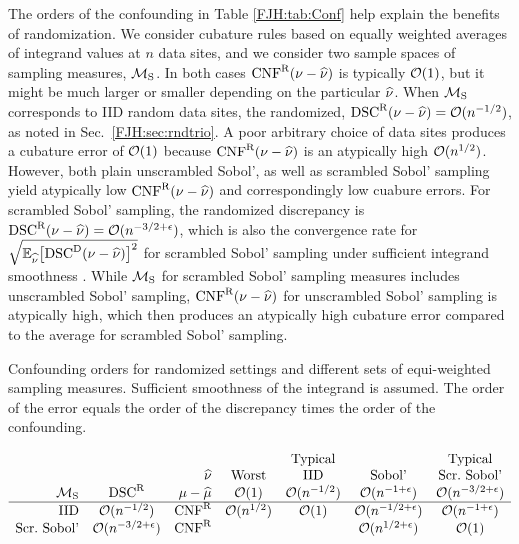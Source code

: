 \documentclass[graybox,footinfo]{svmult}
\begin{document}
The orders of the confounding in Table \ref{FJH:tab:Conf} help explain the 
benefits of randomization.  We consider cubature rules based on equally weighted 
averages of integrand values at $n$ data sites, and we consider two sample spaces of 
sampling measures, ${\mathcal{M}}_{\textup{S}}$.  In both cases $\textup{CNF}^{\textup{R}}(\nu - \widehat{\nu})$ is 
typically ${\mathcal{O}}(1)$, but it might be much larger or smaller depending on the particular 
$\widehat{\nu}$.  When ${\mathcal{M}}_{\textup{S}}$ corresponds to IID random data sites, the 
randomized, $\textup{DSC}^{\textup{R}}(\nu - \widehat{\nu}) = {\mathcal{O}}(n^{-1/2})$, as noted in Sec.\ 
\ref{FJH:sec:rndtrio}.  A poor 
arbitrary choice of data sites produces a cubature error of ${\mathcal{O}}(1)$ because 
$\textup{CNF}^{\textup{R}}(\nu - \widehat{\nu})$ is an atypically high ${\mathcal{O}}(n^{1/2})$.  
However, both plain unscrambled Sobol', as well as scrambled Sobol' sampling yield 
atypically low $\textup{CNF}^{\textup{R}}(\nu - \widehat{\nu})$ and correspondingly low cuabure errors.  For 
scrambled Sobol' sampling, the randomized discrepancy is $\textup{DSC}^{\textup{R}}(\nu - \widehat{\nu}) 
={\mathcal{O}}(n^{-3/2 + 
\epsilon})$, which is also the convergence rate for $\sqrt{{\mathbb{E}}_{\widehat{\nu}}\bigl[\textup{DSC}^{\textup{D}}(\nu - 
\widehat{\nu})\bigr ]^2}$ for scrambled 
Sobol' sampling under sufficient integrand smoothness \cite{HicHon98a, HicYue00}.
While ${\mathcal{M}}_{\textup{S}}$ for scrambled Sobol' sampling measures includes 
unscrambled 
Sobol' 
sampling, $\textup{CNF}^{\textup{R}}(\nu - \widehat{\nu})$ for unscrambled Sobol' sampling is atypically high, 
which then produces an atypically high
cubature error compared to the average for scrambled Sobol' sampling.

\begin{table}
	\caption{Confounding orders for randomized settings and 
		different sets of equi-weighted 
		sampling measures. Sufficient smoothness of the integrand is assumed.
		The order of the error equals the order of the discrepancy times the 
		order of the confounding. \label{FJH:tab:Conf}}
	\begin{equation*}
	\begin{array}{r@{\quad }c@{\quad }r@{\quad}c@{\quad}c@{\quad}c@{\quad}c}
	&&&&\text{Typical} &&\text{Typical}\\
	\multicolumn{3}{r@{\quad}}{\hnu} &  \textup{Worst} &  \textup{IID} &
	\textup{Sobol'}&  \textup{Scr.\ Sobol'}\\
	\calM_{\textup{S}} & \disc^\Rn & \mu - \hmu & \calO(1) & \calO(n^{-1/2}) & 
	\calO(n^{-1+\epsilon}) & 
	\calO(n^{-3/2+\epsilon})\\
	\hline 
	\textup{IID} & \calO(n^{-1/2}) & \algn^\Rn & \calO(n^{1/2})  & \calO(1) 
	&\calO(n^{-1/2+\epsilon}) &\calO(n^{-1+\epsilon}) \\
	\textup{Scr.\ Sobol'} &\calO(n^{-3/2+\epsilon}) & \algn^\Rn 
	& & &\calO(n^{1/2+\epsilon})&\calO(1) 
	\end{array}
	\end{equation*}
\end{table}
\end{document}
